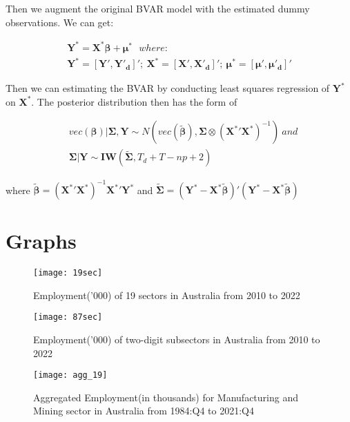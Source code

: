 \documentclass{monashthesis}
\begin{document}
Then we augment the original BVAR model with the estimated dummy observations. We can get:

\[
\begin{aligned}
\bm{Y^*}=\bm{X^*}\bm{\beta}+\bm{\mu}^*\ \ \  where: \\
\bm{Y^*}=[\bm{Y'},\bm{Y'_d}]';\ \bm{X^*}=[\bm{X'},\bm{X'_d}]';\ \bm{\mu^*}=[\bm{\mu'},\bm{\mu'_d}]'
\end{aligned}
\]

Then we can estimating the BVAR by conducting least squares regression of \(\boldsymbol{Y}^*\) on \(\boldsymbol{X}^*\). The posterior distribution then has the form of

\[
\begin{aligned}
&vec(\bm{\beta})|\bm{\Sigma},\bm{Y}\sim N(vec(\boldsymbol{\tilde\beta}),\boldsymbol{\Sigma}\otimes(\boldsymbol{X^*}'\boldsymbol{X^*})^{-1})\ and\\
&\bm{\Sigma}|\bm{Y}\sim\bm{IW}(\bm{\tilde\Sigma},T_d+T-np+2)
\end{aligned}
\]

where \(\bm{\tilde\beta} =({\bm{X^{*}}}'\bm{X^{*}})^{-1} {\bm{X^{*}}}'\bm{Y^{*}}\) and \(\bm{\tilde\Sigma}=(\bm{Y^{*}}-\bm{X^{*}}\bm{\tilde\beta})'(\bm{Y^{*}}-\bm{X^{*}}\bm{\tilde\beta})\)

\newpage

\hypertarget{graphs}{%
\chapter{Graphs}\label{graphs}}

\graphicspath{ {/Users/elvisyang/Desktop/hon_proj/Disaggregated_Employment/Honours_thesis/figures} }

\begin{figure}[t]
\texttt{[image: 19sec]}
\centering
\caption{Employment('000) of 19 sectors in Australia from 2010 to 2022}
\label{fig:19}
\end{figure}

\begin{figure}[t]
\texttt{[image: 87sec]}
\centering
\caption{Employment('000) of two-digit subsectors in Australia from 2010 to 2022}
\label{fig:86}
\end{figure}

\begin{figure}[t]
\texttt{[image: agg\_19]}
\centering
\caption{Aggregated Employment(in thousands) for Manufacturing and Mining sector in Australia from 1984:Q4 to 2021:Q4}
\label{fig:a19}
\end{figure}
\end{document}
